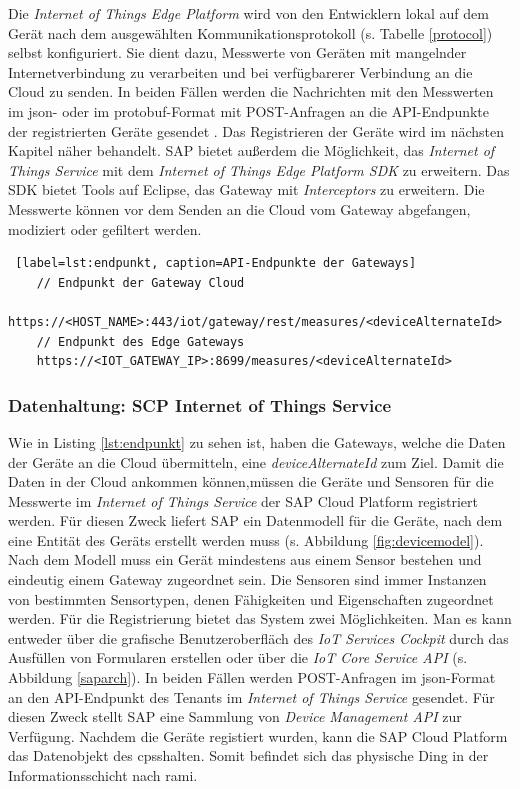   Die \textit{Internet of Things Edge Platform} wird von den Entwicklern lokal auf dem Gerät nach dem ausgewählten Kommunikationsprotokoll (s. Tabelle \ref{protocol}) selbst konfiguriert. Sie dient dazu, Messwerte von Geräten mit mangelnder Internetverbindung zu verarbeiten und bei verfügbarerer Verbindung an die Cloud zu senden. In beiden Fällen werden die Nachrichten mit den Messwerten im \ac{json}- oder im \ac{protobuf}-Format mit POST-Anfragen an die API-Endpunkte der registrierten Geräte gesendet \citep{SAP2020}. Das Registrieren der Geräte wird im nächsten Kapitel näher behandelt. SAP bietet außerdem die Möglichkeit, das \textit{Internet of Things Service} mit dem \textit{Internet of Things Edge Platform SDK} zu erweitern. Das SDK bietet Tools auf Eclipse, das Gateway mit \textit{Interceptors} zu erweitern. Die Messwerte können vor dem Senden an die Cloud vom Gateway abgefangen, modiziert oder gefiltert werden.

  \begin{lstlisting} [label=lst:endpunkt, caption=API-Endpunkte der Gateways]
    // Endpunkt der Gateway Cloud
    https://<HOST_NAME>:443/iot/gateway/rest/measures/<deviceAlternateId>
    // Endpunkt des Edge Gateways
    https://<IOT_GATEWAY_IP>:8699/measures/<deviceAlternateId>
  \end{lstlisting}



\subsubsection{Datenhaltung: SCP Internet of Things Service} \label{iotcp}

Wie in Listing \ref{lst:endpunkt} zu sehen ist, haben die Gateways, welche die Daten der Geräte an die Cloud übermitteln, eine \textit{deviceAlternateId} zum Ziel. Damit die Daten in der Cloud ankommen können,müssen die Geräte und Sensoren für die Messwerte im \textit{Internet of Things Service} der SAP Cloud Platform registriert werden. Für diesen Zweck liefert SAP ein Datenmodell für die Geräte, nach dem eine Entität des Geräts erstellt werden muss (s. Abbildung \ref{fig:devicemodel}). Nach dem Modell muss ein Gerät mindestens aus einem Sensor bestehen und eindeutig einem Gateway zugeordnet sein. Die Sensoren sind immer Instanzen von bestimmten Sensortypen, denen Fähigkeiten und Eigenschaften zugeordnet werden.
Für die Registrierung bietet das System zwei Möglichkeiten. Man es kann entweder über die grafische Benutzeroberfläch des \textit{IoT Services Cockpit} durch das Ausfüllen von Formularen erstellen oder über die \textit{IoT Core Service API} (s. Abbildung \ref{saparch}). In beiden Fällen werden POST-Anfragen im \ac{json}-Format an den API-Endpunkt des Tenants im \textit{Internet of Things Service} gesendet. Für diesen Zweck stellt SAP eine Sammlung von \textit{Device Management API} zur Verfügung. Nachdem die Geräte registiert wurden, kann die SAP Cloud Platform das Datenobjekt des \acf{cpss}halten. Somit befindet sich das physische Ding in der Informationsschicht nach \ac{rami}.

